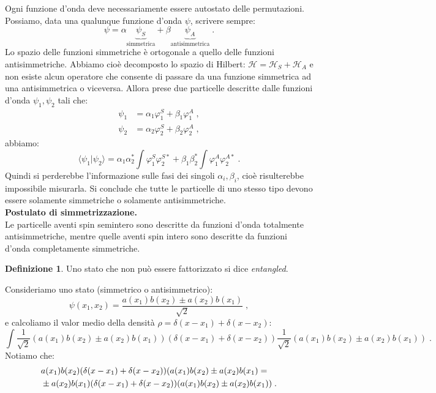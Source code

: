 \documentclass[10pt,a4paper]{report}
\theoremstyle{definition}
\newtheorem{dfn}{Definizione}[section]
\newcommand{\ham}{\mathcal{H}}
\numberwithin{equation}{section}
\newcommand{\bra}{\langle}
\newcommand{\ket}{\rangle}
\begin{document}
Ogni funzione d'onda deve necessariamente essere autostato delle permutazioni.\\
Possiamo, data una qualunque funzione d'onda $\psi$, scrivere sempre:
\begin{equation}
\psi=\alpha\underbrace{\psi_S}_{\mbox{simmetrica}}+\beta\underbrace{\psi_A}_{\mbox{antisimmetrica}}\;.
\end{equation}
Lo spazio delle funzioni simmetriche è ortogonale a quello delle funzioni antisimmetriche. Abbiamo cioè decomposto lo spazio di Hilbert: $\ham=\ham_S+\ham_A$ e non esiste alcun operatore che consente di passare da una funzione simmetrica ad una antisimmetrica o viceversa. Allora prese due particelle descritte dalle funzioni d'onda $\psi_1,\psi_2$ tali che:
\begin{align*}
\psi_1 &= \alpha_1\varphi_1^S+\beta_1\varphi_1^A\;, \\
\psi_2 &= \alpha_2\varphi_2^S+\beta_2\varphi_2^A\;,
\end{align*}
abbiamo:
\begin{equation}
\bra\psi_1|\psi_2\ket=\alpha_1\alpha_2^*\int\varphi_1^S\varphi_2^{S*}+\beta_1\beta_2^*\int\varphi_1^A\varphi_2^{A*}\;.
\end{equation}
Quindi si perderebbe l'informazione sulle fasi dei singoli $\alpha_i,\beta_i$, cioè risulterebbe impossibile misurarla. Si conclude che tutte le particelle di uno stesso tipo devono essere solamente simmetriche o solamente antisimmetriche. \\
\textbf{Postulato di simmetrizzazione.} \\
Le particelle aventi spin semintero sono descritte da funzioni d'onda totalmente antisimmetriche, mentre quelle aventi spin intero sono descritte da funzioni d'onda completamente simmetriche.
\begin{dfn} Uno stato che non può essere fattorizzato si dice \textit{entangled}.
\end{dfn}
Consideriamo uno stato (simmetrico o antisimmetrico):
\begin{equation}
\psi(x_1,x_2)=\frac{a(x_1)b(x_2)\pm a(x_2)b(x_1)}{\sqrt{2}}\;,
\end{equation}
e calcoliamo il valor medio della densità $\rho=\delta(x-x_1)+\delta(x-x_2)$:
\begin{equation}
\int \frac{1}{\sqrt{2}}(a(x_1)b(x_2)\pm a(x_2)b(x_1))(\delta(x-x_1)+\delta(x-x_2))\frac{1}{\sqrt{2}}(a(x_1)b(x_2)\pm a(x_2)b(x_1))\;.
\end{equation}
Notiamo che:
\begin{align}
&a(x_1)b(x_2)(\delta(x-x_1)+\delta(x-x_2))(a(x_1)b(x_2)\pm a(x_2)b(x_1)= \\ \notag
&\pm a(x_2)b(x_1)(\delta(x-x_1)+\delta(x-x_2))(a(x_1)b(x_2)\pm a(x_2)b(x_1))\;.
\end{align}
\end{document}
